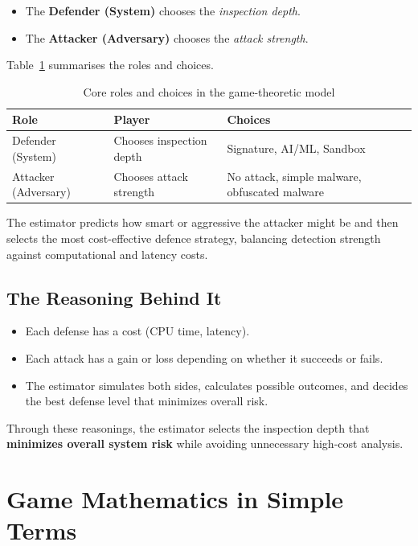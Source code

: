 \documentclass[12pt, a4paper]{report}
\begin{document}
\begin{itemize}
    \item The \textbf{Defender (System)} chooses the \emph{inspection depth}.
    \item The \textbf{Attacker (Adversary)} chooses the \emph{attack strength}.
\end{itemize}

Table~\ref{tab:gte-core-roles} summarises the roles and choices.

\begin{table}[H]
\centering
\caption{Core roles and choices in the game-theoretic model}
\label{tab:gte-core-roles}
\begin{tabular}{|l|l|p{6cm}|}
\hline
\textbf{Role} & \textbf{Player} & \textbf{Choices} \\
\hline
Defender (System) &
Chooses inspection depth &
Signature, AI/ML, Sandbox \\
\hline
Attacker (Adversary) &
Chooses attack strength &
No attack, simple malware, obfuscated malware \\
\hline
\end{tabular}
\end{table}

The estimator predicts how smart or aggressive the attacker might be and then
selects the most cost-effective defence strategy, balancing detection strength
against computational and latency costs.
\subsection*{The Reasoning Behind It}



\begin{itemize}
    \item Each defense has a cost (CPU time, latency).
    \item Each attack has a gain or loss depending on whether it succeeds or fails.
    \item The estimator simulates both sides, calculates possible outcomes, and decides the best defense level that minimizes overall risk.

\end{itemize}

Through these reasonings, the estimator selects the inspection depth that \textbf{minimizes overall system risk} while avoiding unnecessary high-cost analysis.

\section{Game Mathematics in Simple Terms}
\end{document}
